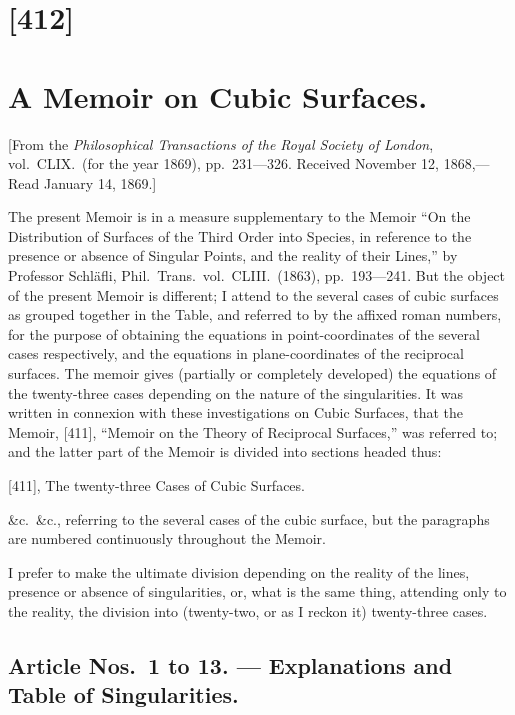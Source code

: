 \documentclass[11pt,a4paper]{article}
\theoremstyle{definition}
\begin{document}
\newpage
\setcounter{page}{359}

\section*{[412]}
\section*{A Memoir on Cubic Surfaces.}

[From the \textit{Philosophical Transactions of the Royal Society of London}, vol.~CLIX.\ (for the year 1869), pp.~231---326. Received November 12, 1868,---Read January 14, 1869.]

The present Memoir is in a measure supplementary to the Memoir ``On the Distribution of Surfaces of the Third Order into Species, in reference to the presence or absence of Singular Points, and the reality of their Lines,'' by Professor Schl\"afli, Phil.\ Trans.\ vol.~CLIII.\ (1863), pp.~193---241. But the object of the present Memoir is different; I attend to the several cases of cubic surfaces as grouped together in the Table, and referred to by the affixed roman numbers, for the purpose of obtaining the equations in point-coordinates of the several cases respectively, and the equations in plane-coordinates of the reciprocal surfaces. The memoir gives (partially or completely developed) the equations of the twenty-three cases depending on the nature of the singularities. It was written in connexion with these investigations on Cubic Surfaces, that the Memoir, [411], ``Memoir on the Theory of Reciprocal Surfaces,'' was referred to; and the latter part of the Memoir is divided into sections headed thus:

[411], The twenty-three Cases of Cubic Surfaces.

\&c.\ \&c., referring to the several cases of the cubic surface, but the paragraphs are numbered continuously throughout the Memoir.

I prefer to make the ultimate division depending on the reality of the lines, presence or absence of singularities, or, what is the same thing, attending only to the reality, the division into (twenty-two, or as I reckon it) twenty-three cases.

\subsection*{Article Nos.~1 to 13. --- Explanations and Table of Singularities.}
\end{document}

